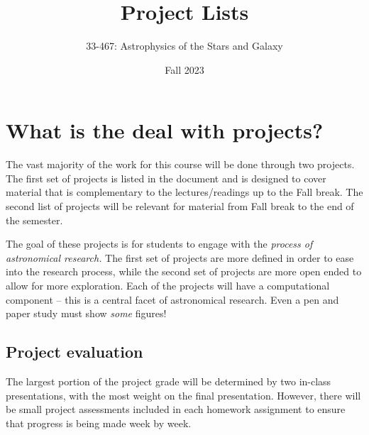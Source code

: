 \documentclass[10pt]{extarticle}
\title{Project Lists}
\author{33-467: Astrophysics of the Stars and Galaxy}
\date{Fall 2023}
\begin{document}
\maketitle


\begin{tcolorbox}[enhanced, title=Contents,
    fonttitle=\fontsize{20}{24}\sffamily\bfseries\selectfont, coltitle=black,
    fontupper=\sffamily, interior style={left color=tcol_CNT1!80,right
    color=tcol_CNT2!80}, frame style={left color=tcol_CNT1!60!black,right
    color=tcol_CNT2!60!black}, attach boxed title to top center={yshift=10pt},
    boxed title style={frame hidden, interior style={left color=tcol_CNT1,right
    color=tcol_CNT2}, frame style={left color=tcol_CNT1!60!black,right
    color=tcol_CNT2!60!black}, height=24pt,bean arc,drop fuzzy shadow },
    top=2mm,bottom=2mm,left=2mm,right=2mm, before skip=20mm,after skip=20mm,
    drop fuzzy shadow,breakable]
%
\makeatletter
{}
\makeatother
\end{tcolorbox}


\section{What is the deal with projects?}

The vast majority of the work for this course will be done through two projects.
The first set of projects is listed in the document and is designed to cover
material that is complementary to the lectures/readings up to the Fall break.
The second list of projects will be relevant for material from Fall break to the
end of the semester.

The goal of these projects is for students to engage with the \emph{process of
astronomical research.} The first set of projects are more defined in order to
ease into the research process, while the second set of projects are more open
ended to allow for more exploration. Each of the projects will have a
computational component -- this is a central facet of astronomical research.
Even a pen and paper study must show \emph{some} figures!

\subsection{Project evaluation}
The largest portion of the project grade will be determined by two in-class
presentations, with the most weight on the final presentation. However, there
will be small project assessments included in each homework assignment to ensure
that progress is being made week by week. 
\end{document}

